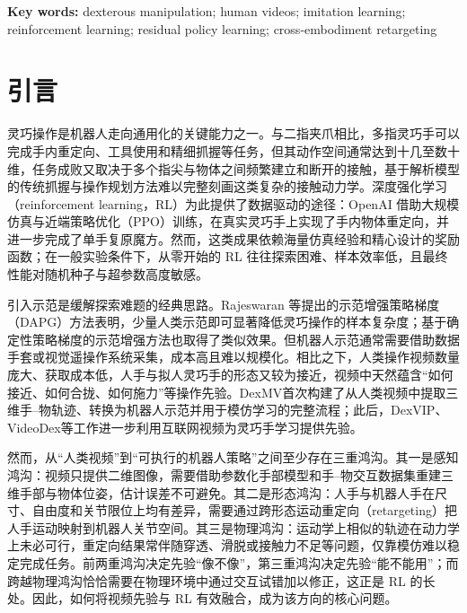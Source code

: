 \documentclass[UTF8,a4paper,zihao=-4]{ctexart}
\begin{document}
\smallskip
\noindent\textbf{Key words:} dexterous manipulation; human videos; imitation learning; reinforcement learning; residual policy learning; cross-embodiment retargeting
\endgroup

\section{引言}\label{sec:intro}

灵巧操作是机器人走向通用化的关键能力之一。与二指夹爪相比，多指灵巧手可以完成手内重定向、工具使用和精细抓握等任务，但其动作空间通常达到十几至数十维，任务成败又取决于多个指尖与物体之间频繁建立和断开的接触，基于解析模型的传统抓握与操作规划方法难以完整刻画这类复杂的接触动力学\cite{okamura2000}。深度强化学习（reinforcement learning，RL）为此提供了数据驱动的途径：OpenAI 借助大规模仿真与近端策略优化（PPO）训练，在真实灵巧手上实现了手内物体重定向\cite{openai2018}，并进一步完成了单手复原魔方\cite{rubik2019}。然而，这类成果依赖海量仿真经验和精心设计的奖励函数；在一般实验条件下，从零开始的 RL 往往探索困难、样本效率低，且最终性能对随机种子与超参数高度敏感\cite{henderson2018,agarwal2021}。

引入示范是缓解探索难题的经典思路。Rajeswaran 等\cite{dapg}提出的示范增强策略梯度（DAPG）方法表明，少量人类示范即可显著降低灵巧操作的样本复杂度；基于确定性策略梯度的示范增强方法也取得了类似效果\cite{ddpgfd,nair2018}。但机器人示范通常需要借助数据手套或视觉遥操作系统采集\cite{dexpilot,anyteleop}，成本高且难以规模化。相比之下，人类操作视频数量庞大、获取成本低，人手与拟人灵巧手的形态又较为接近，视频中天然蕴含“如何接近、如何合拢、如何施力”等操作先验。DexMV\cite{dexmv}首次构建了从人类视频中提取三维手–物轨迹、转换为机器人示范并用于模仿学习的完整流程；此后，DexVIP\cite{dexvip}、VideoDex\cite{videodex}等工作进一步利用互联网视频为灵巧手学习提供先验。

然而，从“人类视频”到“可执行的机器人策略”之间至少存在三重鸿沟。其一是感知鸿沟：视频只提供二维图像，需要借助参数化手部模型\cite{mano}和手–物交互数据集\cite{hic,dexycb}重建三维手部与物体位姿，估计误差不可避免。其二是形态鸿沟：人手与机器人手在尺寸、自由度和关节限位上均有差异，需要通过跨形态运动重定向（retargeting）把人手运动映射到机器人关节空间\cite{dexmv,dexpilot}。其三是物理鸿沟：运动学上相似的轨迹在动力学上未必可行，重定向结果常伴随穿透、滑脱或接触力不足等问题，仅靠模仿难以稳定完成任务\cite{vividex,dextrack}。前两重鸿沟决定先验“像不像”，第三重鸿沟决定先验“能不能用”；而跨越物理鸿沟恰恰需要在物理环境中通过交互试错加以修正，这正是 RL 的长处。因此，如何将视频先验与 RL 有效融合，成为该方向的核心问题\cite{maniptrans,human2sim2robot}。
\end{document}
